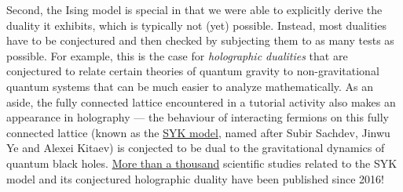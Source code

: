 Second, the Ising model is special in that we were able to explicitly derive the duality it exhibits, which is typically not (yet) possible.
Instead, most dualities have to be conjectured and then checked by subjecting them to as many tests as possible.
For example, this is the case for \textit{holographic dualities} that are conjectured to relate certain theories of quantum gravity to non-gravitational quantum systems that can be much easier to analyze mathematically.
As an aside, the fully connected lattice encountered in a tutorial activity also makes an appearance in holography --- the behaviour of interacting fermions on this fully connected lattice (known as the \href{https://en.wikipedia.org/wiki/Sachdev-Ye-Kitaev_model}{SYK model}, named after Subir Sachdev, Jinwu Ye and Alexei Kitaev) is conjected to be dual to the gravitational dynamics of quantum black holes.
\href{https://inspirehep.net/literature/342314}{More than a thousand} scientific studies related to the SYK model and its conjectured holographic duality have been published since 2016!
